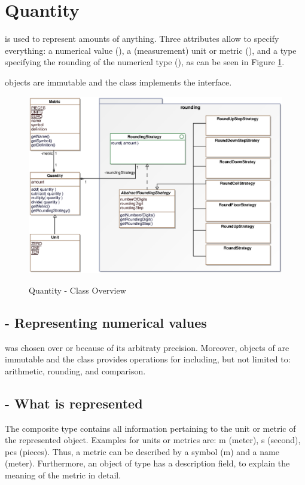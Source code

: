 \newpage
\section{Quantity}
\label{sec:quantity}
 is used to represent amounts of anything.
Three attributes allow  to specify everything: a numerical value (), a (measurement) unit or metric (), and a type specifying the rounding of the numerical type (), as can be seen in Figure \ref{quantity_overview}.

 objects are immutable and the class implements the  interface.

\begin{figure}[ht]
	\centering
  \includegraphics[width=1.0\textwidth]{images/Quantity_Overview.eps}
	\label{quantity_overview}
	\caption{Quantity - Class Overview}
\end{figure}

\subsection{ - Representing numerical values}
 was chosen over  or  because of its arbitraty precision.
Moreover, objects of  are immutable and the  class provides operations for including, but not limited to: arithmetic, rounding, and comparison.

\subsection{ - What is represented}
The composite type  contains all information pertaining to the unit or metric of the represented object.
Examples for units or metrics are: m (meter), s (second), pcs (pieces).
Thus, a metric can be described by a symbol (m) and a name (meter).
Furthermore, an object of type  has a description field, to explain the meaning of the metric in detail.

